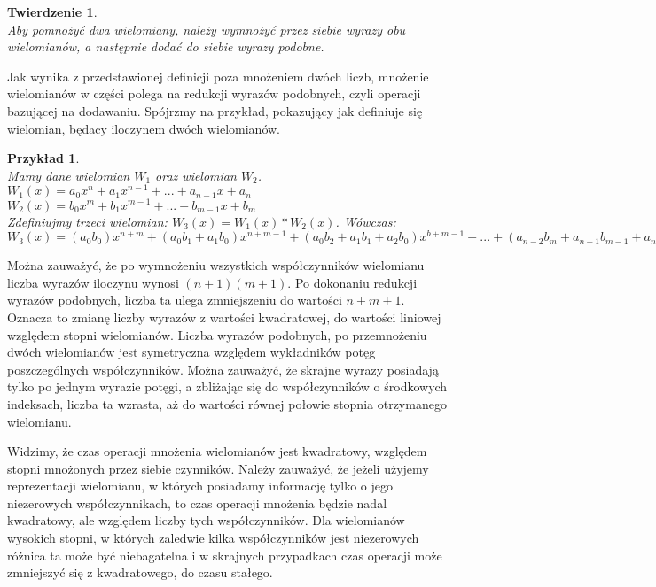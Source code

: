 \documentclass[oneside,a4paper]{book}
\newtheorem{theorem}{Twierdzenie}
\newtheorem{example}{Przykład}
\begin{document}
	\begin{theorem}
		$ $\\
		Aby pomnożyć dwa wielomiany, należy wymnożyć przez siebie wyrazy obu wielomianów, a następnie dodać do siebie wyrazy podobne.
	\end{theorem}
	
	Jak wynika z przedstawionej definicji poza mnożeniem dwóch liczb, mnożenie wielomianów w części polega na redukcji wyrazów podobnych, czyli operacji bazującej na dodawaniu. Spójrzmy na przykład, pokazujący jak definiuje się wielomian, będacy iloczynem dwóch wielomianów.
	
	\begin{example}
		$ $\\
		Mamy dane wielomian $W_1$ oraz wielomian $W_2$. \\
		$W_1(x) = a_0x^n + a_1x^{n-1} + ... + a_{n-1}x + a_n$ \\
		$W_2(x) = b_0x^m + b_1x^{m-1} + ... + b_{m-1}x + b_m$ \\
		Zdefiniujmy trzeci wielomian: $W_3(x) = W_1(x) * W_2(x)$. Wówczas: \\
		$W_3(x) = (a_0b_0)x^{n+m} + (a_0b_1+a_1b_0)x^{n+m-1} + (a_0b_2+a_1b_1+a_2b_0)x^{b+m-1} + ... + (a_{n-2}b_m+a_{n-1}b_{m-1}+a_nb_{m-2})x^2 + (a_{n-1}b_m + a_nb_{m-1})x + a_nb_m$
	\end{example}
	
	Można zauważyć, że po wymnożeniu wszystkich współczynników wielomianu liczba wyrazów iloczynu wynosi $(n+1)(m+1)$. Po dokonaniu redukcji wyrazów podobnych, liczba ta ulega zmniejszeniu do wartości $n+m+1$. Oznacza to zmianę liczby wyrazów z wartości kwadratowej, do wartości liniowej względem stopni wielomianów. Liczba wyrazów podobnych, po przemnożeniu dwóch wielomianów jest symetryczna względem wykładników potęg poszczególnych współczynników. Można zauważyć, że skrajne wyrazy posiadają tylko po jednym wyrazie potęgi, a zbliżając się do współczynników o środkowych indeksach, liczba ta wzrasta, aż do wartości równej połowie stopnia otrzymanego wielomianu.
	
	Widzimy, że czas operacji mnożenia wielomianów jest kwadratowy, względem stopni mnożonych przez siebie czynników. Należy zauważyć, że jeżeli użyjemy reprezentacji wielomianu, w których posiadamy informację tylko o jego niezerowych współczynnikach, to czas operacji mnożenia będzie nadal kwadratowy, ale względem liczby tych współczynników. Dla wielomianów wysokich stopni, w których zaledwie kilka współczynników jest niezerowych różnica ta może być niebagatelna i w skrajnych przypadkach czas operacji może zmniejszyć się z kwadratowego, do czasu stałego.
	
\end{document}

